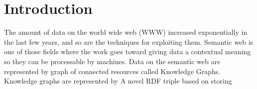 \chapter{Introduction}
\label{ch:introduction}

The amount of data on the world wide web (WWW) increased exponentially in the last few years, and so are the techniques for exploiting them. Semantic web is one of those fields where the work goes toward giving data a contextual meaning so they can be processable by machines. Data on the semantic web are represented by graph of connected resources called Knowledge Graphs. Knowledge graphs are represented by
A novel RDF triple based on storing \\ 

